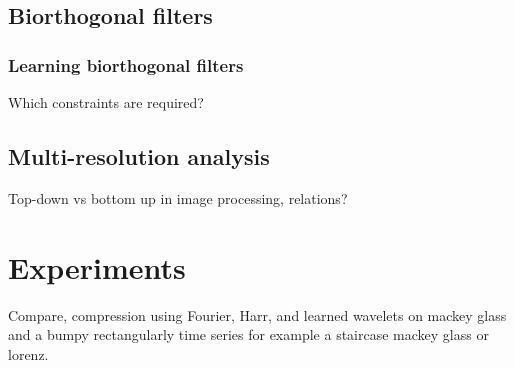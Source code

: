 \documentclass{article}
\begin{document}
\subsection{Biorthogonal filters}




\subsubsection{Learning biorthogonal filters}
Which constraints are required?

\subsection{Multi-resolution analysis}
Top-down vs bottom up in image processing, relations?


\section{Experiments}
Compare, compression using Fourier, Harr, and learned wavelets on mackey glass and a bumpy
rectangularly time series for example a staircase mackey glass or lorenz.

\newpage
{\small


}
\end{document}
